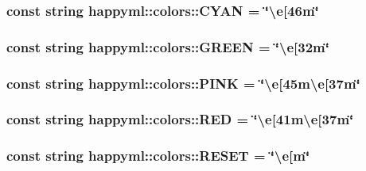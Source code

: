 \subsubsection[{\texorpdfstring{C\+Y\+AN}{CYAN}}]{\setlength{\rightskip}{0pt plus 5cm}const string happyml\+::colors\+::\+C\+Y\+AN = \char`\"{}\textbackslash{}e\mbox{[}46m\char`\"{}}\hypertarget{namespacehappyml_1_1colors_a11d5d83dc04c05bb83a9818de86ad63e}{}\label{namespacehappyml_1_1colors_a11d5d83dc04c05bb83a9818de86ad63e}
\subsubsection[{\texorpdfstring{G\+R\+E\+EN}{GREEN}}]{\setlength{\rightskip}{0pt plus 5cm}const string happyml\+::colors\+::\+G\+R\+E\+EN = \char`\"{}\textbackslash{}e\mbox{[}32m\char`\"{}}\hypertarget{namespacehappyml_1_1colors_ad37054e800edc077c369046fbf1964b4}{}\label{namespacehappyml_1_1colors_ad37054e800edc077c369046fbf1964b4}
\subsubsection[{\texorpdfstring{P\+I\+NK}{PINK}}]{\setlength{\rightskip}{0pt plus 5cm}const string happyml\+::colors\+::\+P\+I\+NK = \char`\"{}\textbackslash{}e\mbox{[}45m\textbackslash{}e\mbox{[}37m\char`\"{}}\hypertarget{namespacehappyml_1_1colors_a18cdb6ebba3b1cf1716820ca55594f38}{}\label{namespacehappyml_1_1colors_a18cdb6ebba3b1cf1716820ca55594f38}
\subsubsection[{\texorpdfstring{R\+ED}{RED}}]{\setlength{\rightskip}{0pt plus 5cm}const string happyml\+::colors\+::\+R\+ED = \char`\"{}\textbackslash{}e\mbox{[}41m\textbackslash{}e\mbox{[}37m\char`\"{}}\hypertarget{namespacehappyml_1_1colors_a7dd908033a249e2355f86fe520b59b8d}{}\label{namespacehappyml_1_1colors_a7dd908033a249e2355f86fe520b59b8d}
\subsubsection[{\texorpdfstring{R\+E\+S\+ET}{RESET}}]{\setlength{\rightskip}{0pt plus 5cm}const string happyml\+::colors\+::\+R\+E\+S\+ET = \char`\"{}\textbackslash{}e\mbox{[}m\char`\"{}}\hypertarget{namespacehappyml_1_1colors_ac7bc97b2ebca85fdfbf6ffe42e53db4b}{}\label{namespacehappyml_1_1colors_ac7bc97b2ebca85fdfbf6ffe42e53db4b}
